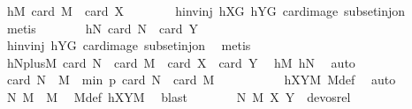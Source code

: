 \begin{isabellebody}
\ hM{\isacharcolon}{\kern0pt}\ {\isachardoublequoteopen}card\ {\isacharquery}{\kern0pt}M\ {\isacharequal}{\kern0pt}\ card\ X{\isachardoublequoteclose}\isanewline
\ \ \ \ \ \ \isamarkupfalse%
\ hinvinj\ hXG\ hYG\ card{\isacharunderscore}{\kern0pt}image\ subset{\isacharunderscore}{\kern0pt}inj{\isacharunderscore}{\kern0pt}on\ \isamarkupfalse%
\ metis\isanewline
\ \ \ \ \isamarkupfalse%
\ \isamarkupfalse%
\ hN{\isacharcolon}{\kern0pt}\ {\isachardoublequoteopen}card\ {\isacharquery}{\kern0pt}N\ {\isacharequal}{\kern0pt}\ card\ Y{\isachardoublequoteclose}\ \isanewline
\ \ \ \ \ \ \isamarkupfalse%
\ hinvinj\ hYG\ card{\isacharunderscore}{\kern0pt}image\ subset{\isacharunderscore}{\kern0pt}inj{\isacharunderscore}{\kern0pt}on\ \isamarkupfalse%
\ metis\isanewline
\ \ \ \ \isamarkupfalse%
\ \isamarkupfalse%
\ hNplusM{\isacharcolon}{\kern0pt}\ {\isachardoublequoteopen}card\ {\isacharquery}{\kern0pt}N\ {\isacharplus}{\kern0pt}\ card\ {\isacharquery}{\kern0pt}M\ {\isacharequal}{\kern0pt}\ card\ X\ {\isacharplus}{\kern0pt}\ card\ Y{\isachardoublequoteclose}\ \isamarkupfalse%
\ hM\ hN\ \isamarkupfalse%
\ auto\isanewline
\ \ \ \ \isamarkupfalse%
\ \isamarkupfalse%
\ {\isachardoublequoteopen}card\ {\isacharparenleft}{\kern0pt}{\isacharquery}{\kern0pt}N\ {\isasymcdots}\ {\isacharquery}{\kern0pt}M{\isacharparenright}{\kern0pt}\ {\isacharless}{\kern0pt}\ min\ p\ {\isacharparenleft}{\kern0pt}card\ {\isacharquery}{\kern0pt}N\ {\isacharplus}{\kern0pt}\ card\ {\isacharquery}{\kern0pt}M\ {\isacharminus}{\kern0pt}\ {}{\isacharparenright}{\kern0pt}{\isachardoublequoteclose}\ \isanewline
\ \ \ \ \ \ \isamarkupfalse%
\ hXYM\ M{\isacharunderscore}{\kern0pt}def\ \isamarkupfalse%
\ auto\isanewline
\ \ \ \ \isamarkupfalse%
\ \isamarkupfalse%
\ {\isachardoublequoteopen}{\isacharparenleft}{\kern0pt}{\isacharquery}{\kern0pt}N{\isacharcomma}{\kern0pt}\ {\isacharquery}{\kern0pt}M{\isacharparenright}{\kern0pt}\ {\isasymin}\ M{\isachardoublequoteclose}\ \isamarkupfalse%
\ M{\isacharunderscore}{\kern0pt}def\ hXYM\ \isamarkupfalse%
\ blast\isanewline
\ \ \ \ \isamarkupfalse%
\ \isamarkupfalse%
\ {\isachardoublequoteopen}{\isacharparenleft}{\kern0pt}{\isacharparenleft}{\kern0pt}{\isacharquery}{\kern0pt}N{\isacharcomma}{\kern0pt}\ {\isacharquery}{\kern0pt}M{\isacharparenright}{\kern0pt}{\isacharcomma}{\kern0pt}\ {\isacharparenleft}{\kern0pt}X{\isacharcomma}{\kern0pt}\ Y{\isacharparenright}{\kern0pt}{\isacharparenright}{\kern0pt}\ {\isasymnotin}\ devos{\isacharunderscore}{\kern0pt}rel{\isachardoublequoteclose}\ \isamarkupfalse%

\end{isabellebody}
